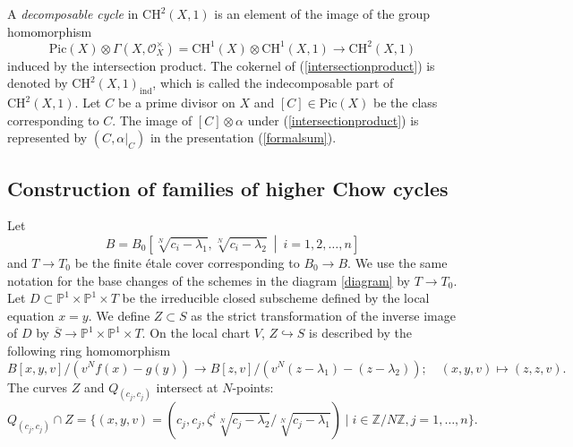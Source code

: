 \documentclass[letterpaper, 11pt]{amsart}
\theoremstyle{my theoremstyle}
\theoremstyle{dfn}
\theoremstyle{remark}
\renewcommand{\1}{\mathbbm{1}}
\newcommand{\Z}{\mathbb{Z}}
\renewcommand{\P}{\mathbb{P}}
\renewcommand{\l}{\lambda}
\numberwithin{equation}{section}
\begin{document}
A \textit{decomposable cycle} in $\mathrm{CH}^2(X,1)$ is an element of the image of the group homomorphism
\begin{equation}\label{intersectionproduct}
\mathrm{Pic}(X)\otimes \Gamma(X,\mathscr{O}_X^\times)=\mathrm{CH}^1(X)\otimes \mathrm{CH}^1(X,1) \longrightarrow \mathrm{CH}^2(X,1)
\end{equation}
induced by the intersection product. 
The cokernel of (\ref{intersectionproduct}) is denoted by $\mathrm{CH}^2(X,1)_{\mathrm{ind}}$, 
which is called the indecomposable part of $\mathrm{CH}^2(X,1)$. 
Let $C$ be a prime divisor on $X$ and $[C]\in \mathrm{Pic}(X)$ be the class corresponding to $C$. 
The image of $[C]\otimes \alpha$ under (\ref{intersectionproduct}) is represented by $(C,\alpha|_C)$ in the presentation (\ref{formalsum}). 

\subsection{Construction of families of higher Chow cycles}
Let 
$$B= B_0\left[\sqrt[N]{c_i-\l_1}, \sqrt[N]{c_i-\l_2}\:\middle|\: i=1,2,\dots,n\right]$$ 
and $T \to T_0$ be the finite \'etale cover corresponding to $B_0 \to B$. 
We use the same notation for the base changes of the schemes in the diagram \eqref{diagram} by $T \to T_0$. 
Let $D \subset \P^1 \times \P^1 \times T$ be the irreducible closed subscheme defined by the local equation $x=y$.
We define $Z\subset S$ as the strict transformation of the inverse image of $D$ by $\overline{S} \to \P^1 \times \P^1 \times T$. 
On the local chart $V$, $Z \hookrightarrow S$ is described by the following ring homomorphism 
$$B[x, y, v]/(v^Nf(x)-g(y)) \to B [z, v]/(v^N(z-\l_1)-(z-\l_2)); \quad (x, y, v) \mapsto (z, z, v). $$
The curves $Z$ and $Q_{(c_j, c_j)}$ intersect at $N$-points: 
$$Q_{(c_j, c_j)} \cap Z= \{(x, y, v)=(c_j, c_j,  \zeta^i \sqrt[N]{c_j-\l_2}/\sqrt[N]{c_j-\l_1}) \mid i \in \Z/N\Z, j=1, \ldots, n \}. $$ 
\end{document}

